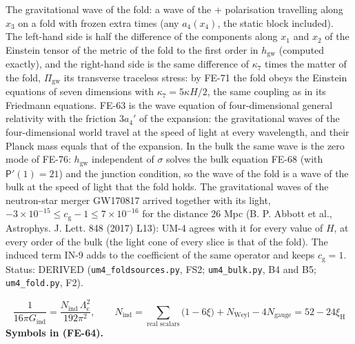 \documentclass[
  10pt,
]{article}
\begin{document}
The gravitational wave of the fold: a wave of the + polarisation
travelling along \(x_3\) on a fold with frozen extra times (any
\(a_4(x_4)\), the static block included). The left-hand side is half the
difference of the components along \(x_1\) and \(x_2\) of the Einstein
tensor of the metric of the fold to the first order in
\(h_{\mathrm{gw}}\) (computed exactly), and the right-hand side is the
same difference of \(\kappa_7\) times the matter of the fold,
\(\Pi_{\mathrm{gw}}\) its transverse traceless stress: by FE-71 the fold
obeys the Einstein equations of seven dimensions with
\(\kappa_7 = 5\kappa H/2\), the same coupling as in its Friedmann
equations. FE-63 is the wave equation of four-dimensional general
relativity with the friction \(3a_4'\) of the expansion: the
gravitational waves of the four-dimensional world travel at the speed of
light at every wavelength, and their Planck mass equals that of the
expansion. In the bulk the same wave is the zero mode of FE-76:
\(h_{\mathrm{gw}}\) independent of \(\sigma\) solves the bulk equation
FE-68 (with \(\mathsf{P}'(1) = 21\)) and the junction condition, so the
wave of the fold is a wave of the bulk at the speed of light that the
fold holds. The gravitational waves of the neutron-star merger GW170817
arrived together with its light,
\(-3\times10^{-15} \le c_{\mathrm{g}} - 1 \le 7\times10^{-16}\) for the
distance 26 Mpc (B. P. Abbott et al., Astrophys. J. Lett. 848 (2017)
L13): UM-4 agrees with it for every value of \(H\), at every order of
the bulk (the light cone of every slice is that of the fold). The
induced term IN-9 adds to the coefficient of the same operator and keeps
\(c_{\mathrm{g}} = 1\). Status: DERIVED (\texttt{um4\_foldsources.py},
FS2; \texttt{um4\_bulk.py}, B4 and B5; \texttt{um4\_fold.py}, F2).

\[
\frac{1}{16\pi G_{\mathrm{ind}}} = \frac{N_{\mathrm{ind}}\,\Lambda_{\mathrm{c}}^2}{192\pi^2},\qquad
N_{\mathrm{ind}} = \sum_{\text{real scalars}}\big(1 - 6\xi\big) + N_{\mathrm{Weyl}} - 4N_{\mathrm{gauge}} = 52 - 24\xi_{\mathrm{H}} \tag{FE-64}
\] \textbf{Symbols in (FE-64).}
\end{document}
